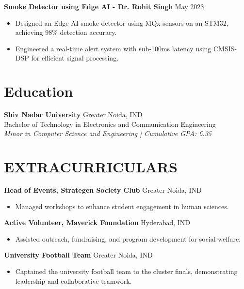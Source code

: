 \documentclass[letterpaper,11pt]{article}
\begin{document}
\textbf{Smoke Detector using Edge AI - Dr. Rohit Singh} \hfill May 2023 \\
\begin{itemize}[leftmargin=*, topsep=0pt, itemsep=-4pt]
    \item Designed an Edge AI smoke detector using MQx sensors on an STM32, achieving 98\% detection accuracy.
    \item Engineered a real-time alert system with sub-100ms latency using CMSIS-DSP for efficient signal processing.
\end{itemize}

\section{Education}
\vspace{2pt}
\textbf{Shiv Nadar University} \hfill Greater Noida, IND \\
Bachelor of Technology in Electronics and Communication Engineering \\
\textit{Minor in Computer Science and Engineering | Cumulative GPA: 6.35}


\section{EXTRACURRICULARS}

\textbf{Head of Events, Strategen Society Club} \hfill Greater Noida, IND \\
\begin{itemize}[leftmargin=*, topsep=0pt, itemsep=-4pt]
    \item Managed workshops to enhance student engagement in human sciences.
\end{itemize}
\vspace{0pt}

\textbf{Active Volunteer, Maverick Foundation} \hfill Hyderabad, IND \\
\begin{itemize}[leftmargin=*, topsep=0pt, itemsep=-4pt]
    \item Assisted outreach, fundraising, and program development for social welfare.
\end{itemize}
\vspace{0pt}

\textbf{University Football Team} \hfill Greater Noida, IND \\
\begin{itemize}[leftmargin=*, topsep=0pt, itemsep=-4pt]
    \item Captained the university football team to the cluster finals, demonstrating leadership and collaborative teamwork.
\end{itemize}
\end{document}

